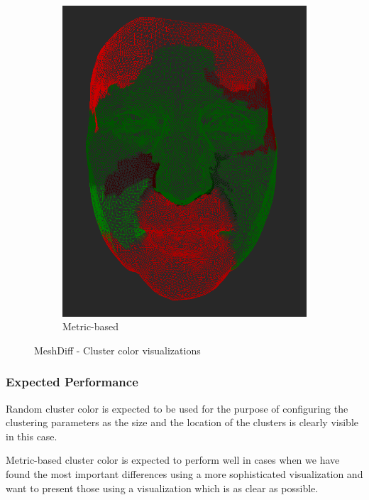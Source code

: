 \begin{figure}[h]
\begin{subfigure}{0.4\textwidth}
	\includegraphics[width=\textwidth]{./img/meshdiff-clustercolor-metric.PNG}
    \caption{Metric-based}
    \label{fig:meshdiff-clustercolor_metric}
	\end{subfigure}
    
\caption[MeshDiff - Cluster color visualizations]{MeshDiff - Cluster color visualizations}
\end{figure}

\subsubsection{Expected Performance}

Random cluster color is expected to be used for the purpose of configuring the clustering parameters as the size and the location of the clusters is clearly visible in this case.

Metric-based cluster color is expected to perform well in cases when we have found the most important differences using a more sophisticated visualization and want to present those using a visualization which is as clear as possible.
